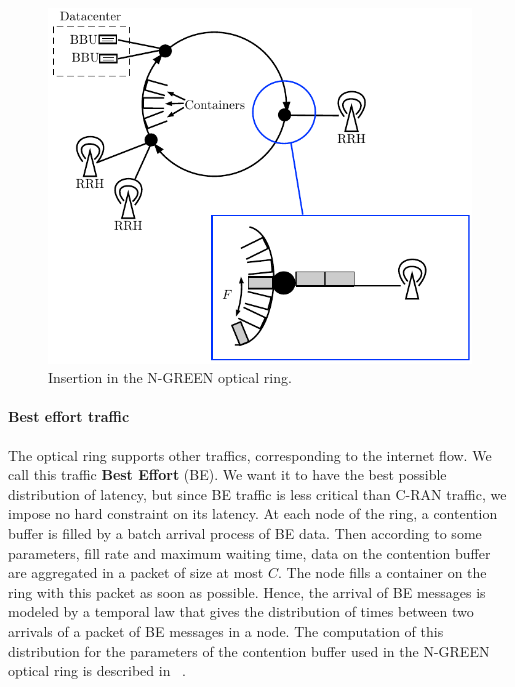 \documentclass[10pt, conference, letterpaper]{IEEEtran}
\begin{document}
    
\begin{figure}[h!]
\begin{center}   

      \includegraphics[scale=0.7]{interface.pdf}
     \caption{Insertion in the N-GREEN optical ring.}\label{fig:interface}
     
\end{center}
  \end{figure}


\paragraph{Best effort traffic}

The optical ring supports other traffics, corresponding to the internet flow. We call this traffic \textbf{Best Effort} (BE). We want it to have the best possible distribution of latency, but since BE traffic is less critical than C-RAN traffic, we impose no hard constraint on its latency. At each node of the ring, a contention buffer is filled by a batch arrival process of BE data. Then according to some parameters, fill rate and maximum waiting time, data on the contention buffer are aggregated in a packet of size at most $C$. The node fills a container on the ring with this packet as soon as possible. Hence, the arrival of BE messages is modeled by a temporal law that gives the distribution of times between two arrivals of a packet of BE messages in a node. The computation of this distribution for the parameters of the contention buffer used in the N-GREEN optical ring is described in ~\cite{youssef2018}.
\end{document}
